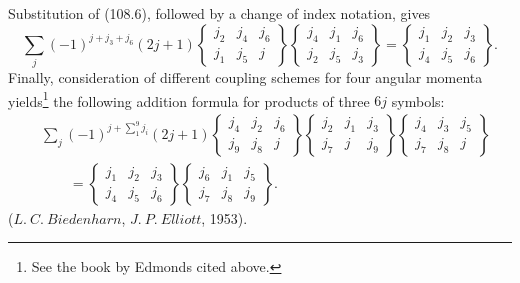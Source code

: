 Substitution of (108.6), followed by a change of index notation, gives
\begin{equation}
\sum_j(-1)^{j+j_3+j_6}(2j+1)
\left\{\begin{matrix}j_2&j_4&j_6\\j_1&j_5&j\end{matrix}\right\}
\left\{\begin{matrix}j_4&j_1&j_6\\j_2&j_5&j_3\end{matrix}\right\}
=\left\{\begin{matrix}j_1&j_2&j_3\\j_4&j_5&j_6\end{matrix}\right\}.
\tag{108.8}
\end{equation}
Finally, consideration of different coupling schemes for four angular momenta yields\footnote{See the book by Edmonds cited above.} the following addition formula for products of three $6j$ symbols:
\begin{equation}
\begin{aligned}
&\sum_j(-1)^{j+\sum_{1}^{9}j_i}(2j+1)
\left\{\begin{matrix}j_4&j_2&j_6\\j_9&j_8&j\end{matrix}\right\}
\left\{\begin{matrix}j_2&j_1&j_3\\j_7&j&j_9\end{matrix}\right\}
\left\{\begin{matrix}j_4&j_3&j_5\\j_7&j_8&j\end{matrix}\right\}\\
&\qquad=\left\{\begin{matrix}j_1&j_2&j_3\\j_4&j_5&j_6\end{matrix}\right\}
\left\{\begin{matrix}j_6&j_1&j_5\\j_7&j_8&j_9\end{matrix}\right\}.
\end{aligned}
\tag{108.9}
\end{equation}
($L.\ C.\ Biedenharn$, $J.\ P.\ Elliott$, 1953).


